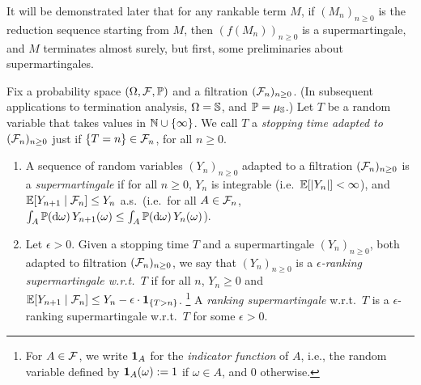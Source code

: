 It will be demonstrated later that for any rankable term $M$, if $(M_n)_{n \geq 0}$ is the reduction sequence starting from $M$, then $(f(M_n))_{n \geq 0}$ is a supermartingale, and $M$ terminates almost surely, but first, some preliminaries about supermartingales.


Fix a probability space $(\Omega, \mathcal{F}, \mathbb{P})$ and a filtration $(\mathcal{F}_n)_{n \geq 0}$. 
(In subsequent applications to termination analysis, $\Omega = {\mathbb{S}}$, and $\mathbb{P} = \mu_{{\mathbb{S}}}$.)
Let $T$ be a random variable that takes values in $\mathbb{N} \cup \{\infty\}$.
We call $T$ a \emph{stopping time adapted to $(\mathcal{F}_n)_{n \geq 0}$} just if $\{T = n\} \in \mathcal{F}_n$, for all $n \geq 0$.

\begin{definition}\rm
\begin{enumerate}
\item A sequence of random variables $(Y_n)_{n \geq 0}$ adapted to a filtration $(\mathcal{F}_n)_{n \geq 0}$ is a \emph{supermartingale} if for all $n \geq 0$, $Y_n$ is integrable (i.e.~$\mathbb{E}[|Y_n|] < \infty$), and $\mathbb{E}[Y_{n+1} \mid \mathcal{F}_n] \leq Y_n$ a.s.~(i.e.~for all $A \in \mathcal{F}_n$, $\int_A \mathbb{P}(\mathrm{d} \omega) \, Y_{n+1}(\omega) \leq \int_A \mathbb{P}(\mathrm{d} \omega) \,Y_n(\omega)$).
\item Let $\epsilon > 0$. 
Given a stopping time $T$ and a supermartingale $(Y_n)_{n \geq 0}$, both adapted to filtration $(\mathcal{F}_n)_{n \geq 0}$, 
we say that $(Y_n)_{n \geq 0}$ is a \emph{$\epsilon$-ranking supermartingale w.r.t.~$T$} if for all $n$, $Y_n \geq 0$ and $\mathbb{E}[Y_{n+1} \mid \mathcal{F}_n] \leq Y_n - \epsilon \cdot \mathbf{1}_{\{T > n\}}$.
\footnote{For $A \in \mathcal{F}$, we write ${\bf 1}_A$ for the \emph{indicator function} of $A$, i.e., the random variable defined by ${\bf 1}_A(\omega) := 1$ if $\omega \in A$, and $0$ otherwise.} %
A \emph{ranking supermartingale} w.r.t.~$T$ is a $\epsilon$-ranking supermartingale w.r.t.~$T$ for some $\epsilon > 0$.
\end{enumerate}
\end{definition}

